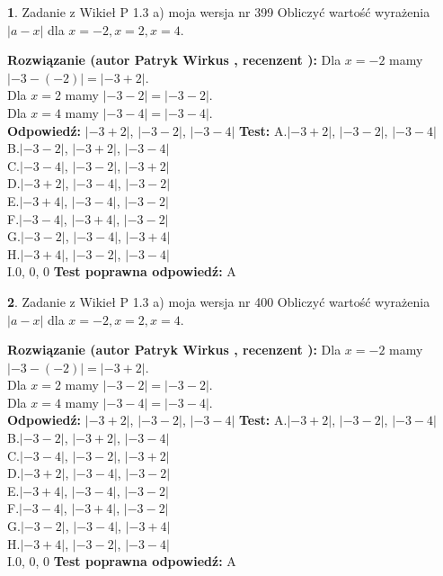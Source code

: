 \documentclass[12pt, a4paper]{article}
\theoremstyle{definition} %
\newtheorem{zad}{}
\newcommand{\zadStart}[1]{\begin{zad}#1\newline}
\newcommand{\zadStop}{\end{zad}}
\newcommand{\rozwStart}[2]{\noindent \textbf{Rozwiązanie (autor #1 , recenzent #2): }\newline}
\newcommand{\rozwStop}{\newline}
\newcommand{\odpStart}{\noindent \textbf{Odpowiedź:}\newline}
\newcommand{\odpStop}{\newline}
\newcommand{\testStart}{\noindent \textbf{Test:}\newline}
\newcommand{\testStop}{\newline}
\newcommand{\kluczStart}{\noindent \textbf{Test poprawna odpowiedź:}\newline}
\newcommand{\kluczStop}{\newline}
\begin{document}
\zadStart{Zadanie z Wikieł P 1.3 a) moja wersja nr 399}
Obliczyć wartość wyrażenia $|a - x|$ dla $x=-2,x=2,x=4$.
\zadStop
\rozwStart{Patryk Wirkus}{}
Dla $x = -2$ mamy $|-3 - (-2)| = |-3 + 2|$.\\
Dla $x = 2$ mamy $|-3 - 2| = |-3 - 2|$.\\
Dla $x = 4$ mamy $|-3 - 4| = |-3 - 4|$.\\
\rozwStop
\odpStart
$|-3 + 2|$, $|-3 - 2|$, $|-3 - 4|$
\odpStop
\testStart
A.$|-3 + 2|$, $|-3 - 2|$, $|-3 - 4|$\\
B.$|-3 - 2|$, $|-3 + 2|$, $|-3 - 4|$\\
C.$|-3 - 4|$, $|-3 - 2|$, $|-3 + 2|$\\
D.$|-3 + 2|$, $|-3 - 4|$, $|-3 - 2|$\\
E.$|-3 + 4|$, $|-3 - 4|$, $|-3 - 2|$\\
F.$|-3 - 4|$, $|-3 + 4|$, $|-3 - 2|$\\
G.$|-3 - 2|$, $|-3 - 4|$, $|-3 + 4|$\\
H.$|-3 + 4|$, $|-3 - 2|$, $|-3 - 4|$\\
I.$0$, $0$, $0$
\testStop
\kluczStart
A
\kluczStop



\zadStart{Zadanie z Wikieł P 1.3 a) moja wersja nr 400}
Obliczyć wartość wyrażenia $|a - x|$ dla $x=-2,x=2,x=4$.
\zadStop
\rozwStart{Patryk Wirkus}{}
Dla $x = -2$ mamy $|-3 - (-2)| = |-3 + 2|$.\\
Dla $x = 2$ mamy $|-3 - 2| = |-3 - 2|$.\\
Dla $x = 4$ mamy $|-3 - 4| = |-3 - 4|$.\\
\rozwStop
\odpStart
$|-3 + 2|$, $|-3 - 2|$, $|-3 - 4|$
\odpStop
\testStart
A.$|-3 + 2|$, $|-3 - 2|$, $|-3 - 4|$\\
B.$|-3 - 2|$, $|-3 + 2|$, $|-3 - 4|$\\
C.$|-3 - 4|$, $|-3 - 2|$, $|-3 + 2|$\\
D.$|-3 + 2|$, $|-3 - 4|$, $|-3 - 2|$\\
E.$|-3 + 4|$, $|-3 - 4|$, $|-3 - 2|$\\
F.$|-3 - 4|$, $|-3 + 4|$, $|-3 - 2|$\\
G.$|-3 - 2|$, $|-3 - 4|$, $|-3 + 4|$\\
H.$|-3 + 4|$, $|-3 - 2|$, $|-3 - 4|$\\
I.$0$, $0$, $0$
\testStop
\kluczStart
A
\kluczStop
\end{document}
